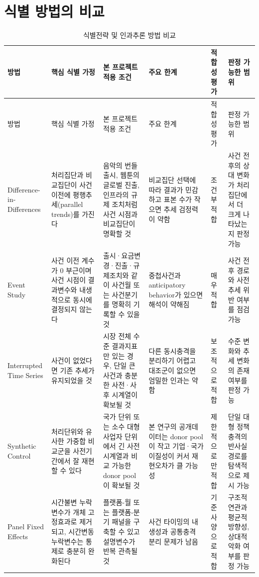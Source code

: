 \documentclass[11pt,a4paper]{report}
\newcommand{\WrapCell}[1]{\parbox[t]{\hsize}{\RaggedRight #1}}
\begin{document}
\section{식별 방법의 비교}
\begin{landscape}
\scriptsize
\setlength{\tabcolsep}{2pt}
\begin{longtable}{@{}L{2.0cm}L{3.8cm}L{3.1cm}L{2.6cm}L{1.6cm}L{3.9cm}@{}}
\caption{식별전략 및 인과추론 방법 비교\label{tab:identification_method_compare}} \\
\toprule
{}
방법 & 핵심 식별 가정 & 본 프로젝트 적용 조건 & 주요 한계 & 적합성 평가 & 판정 가능한 범위 \\
\midrule
\endfirsthead
\toprule
{}
방법 & 핵심 식별 가정 & 본 프로젝트 적용 조건 & 주요 한계 & 적합성 평가 & 판정 가능한 범위 \\
\midrule
\endhead
\WrapCell{Difference-in-\\Differences} & 처리집단과 비교집단이 사건 이전에 평행추세(parallel trends)를 가진다 & 음악의 번들 출시, 웹툰의 글로벌 진출, 인프라의 규제 조치처럼 사건 시점과 비교집단이 명확할 것 & 비교집단 선택에 따라 결과가 민감하고 표본 수가 작으면 추세 검정력이 약함 & 조건부 적합 & 사건 전후의 상대 변화가 처리집단에서 더 크게 나타났는지 판정 가능 \\
Event Study & 사건 이전 계수가 0 부근이며 사건 시점이 결과변수와 내생적으로 동시에 결정되지 않는다 & 출시·요금변경·진출·규제조치와 같이 사건월 또는 사건분기를 명확히 기록할 수 있을 것 & 중첩사건과 anticipatory behavior가 있으면 해석이 약해짐 & 매우 적합 & 사건 전후 경로와 사전추세 위반 여부를 점검 가능 \\
\WrapCell{Interrupted\\Time Series} & 사건이 없었다면 기존 추세가 유지되었을 것 & 시장 전체 수준 결과지표만 있는 경우, 단일 큰 사건과 충분한 사전·사후 시계열이 확보될 것 & 다른 동시충격을 분리하기 어렵고 대조군이 없으면 엄밀한 인과는 약함 & 보조적으로 적합 & 수준 변화와 추세 변화의 존재 여부를 판정 가능 \\
\WrapCell{Synthetic\\Control} & 처리단위와 유사한 가중합 비교군을 사전기간에서 잘 재현할 수 있다 & 국가 단위 또는 소수 대형 사업자 단위에서 긴 사전시계열과 비교 가능한 donor pool이 확보될 것 & 본 연구의 공개데이터는 donor pool이 작고 기업·국가 이질성이 커서 재현오차가 클 가능성 & 제한적으로만 적합 & 단일 대형 정책충격의 반사실 경로를 탐색적으로 제시 가능 \\
Panel Fixed Effects & 시간불변 누락변수가 개체 고정효과로 제거되고, 시간변동 누락변수는 통제로 충분히 완화된다 & 플랫폼-월 또는 플랫폼-분기 패널을 구축할 수 있고 설명변수가 반복 관측될 것 & 사건 타이밍의 내생성과 공통충격 분리 문제가 남음 & 기준 사양으로 적합 & 구조적 연관과 평균적 방향성, 상대적 악화 여부를 판정 가능 \\
\bottomrule
\end{longtable}
\normalsize
\end{landscape}
\end{document}
